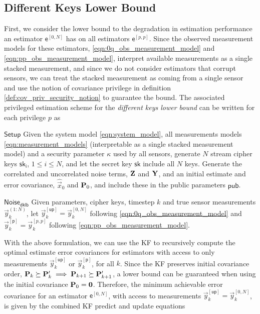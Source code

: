 \documentclass[conference]{IEEEtran}
\theoremstyle{definition}
\theoremstyle{remark}
\begin{document}
\subsection{Different Keys Lower Bound}\label{subsec:crypto_different_keys_lower_bound}
First, we consider the lower bound to the degradation in estimation performance an estimator $\mathsf{e}^{[0,N]}$ has on all estimators $\mathsf{e}^{[p,p]}$. Since the observed measurement models for these estimators, \eqref{eqn:0q_obs_measurement_model} and \eqref{eqn:pp_obs_measurement_model}, interpret available measurements as a single stacked measurement, and since we do not consider estimators that corrupt sensors, we can treat the stacked measurement as coming from a single sensor and use the notion of covariance privilege in definition \ref{def:cov_priv_security_notion} to guarantee the bound. The associated privileged estimation scheme for the \textit{different keys lower bound} can be written for each privilege $p$ as
\begin{LaTeXdescription}
  \item[$\mathsf{Setup}$] Given the system model \eqref{eqn:system_model}, all measurements models \eqref{eqn:measurement_models} (interpretable as a single stacked measurement model) and a security parameter $\kappa$ used by all sensors, generate $N$ stream cipher keys $\mathsf{sk_i}$, $1\leq i \leq N$, and let the secret key $\mathsf{sk}$ include all $N$ keys. Generate the correlated and uncorrelated noise terms, ${{\mathbf{Z}}}$ and ${{\mathbf{Y}}}$, and an initial estimate and error covariance, $\hat{\vec{x}}_0$ and ${{\mathbf{P}}}_0$, and include these in the public parameters $\mathsf{pub}$.
  
  \item[$\mathsf{Noise}_{\mathsf{dklb}}$] Given parameters, cipher keys, timestep $k$ and true sensor measurements $\vec{y}_k^{(1:N)}$, let $\vec{y}_k^{[\mathsf{up}]}=\vec{y}_k^{[0,N]}$ following \eqref{eqn:0q_obs_measurement_model} and $\vec{y}_k^{[\mathsf{p}]}=\vec{y}_k^{[p,p]}$ following \eqref{eqn:pp_obs_measurement_model}.
\end{LaTeXdescription}
With the above formulation, we can use the KF to recursively compute the optimal estimate error covariances for estimators with access to only measurements $\vec{y}_k^{[\mathsf{up}]}$ or $\vec{y}_k^{[\mathsf{p}]}$, for all $k$. Since the KF preserves initial covariance order, ${{\mathbf{P}}}_k \succeq {\ensuremath{{\mathbf{P}}}}_k^\prime \implies {\ensuremath{{\mathbf{P}}}}_{k+1} \succeq {\ensuremath{{\mathbf{P}}}}_{k+1}^\prime$, a lower bound can be guaranteed when using the initial covariance ${{\mathbf{P}}}_0={{\mathbf{0}}}$. Therefore, the minimum achievable error covariance for an estimator $\mathsf{e}^{[0,N]}$, with access to measurements $\vec{y}_k^{[\mathsf{up}]}=\vec{y}_k^{[0,N]}$, is given by the combined KF predict and update equations
\end{document}
